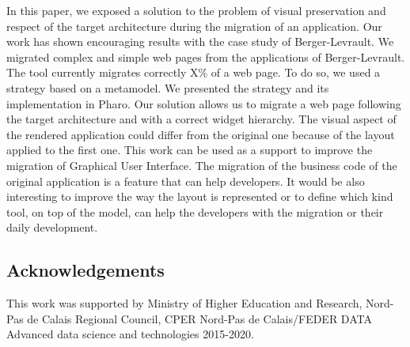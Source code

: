 \documentclass[conference]{IEEEtran}
\begin{document}
    
    In this paper, we exposed a solution to the problem of visual preservation
        and respect of the target architecture during the migration of an application.
    Our work has shown encouraging results with the case study of Berger-Levrault.
    We migrated complex and simple web pages from the applications of Berger-Levrault.
    The tool currently migrates correctly X\% of a web page. %
    To do so, we used a strategy based on a metamodel.
    We presented the strategy and its implementation in Pharo.
    Our solution allows us to migrate a web page following the target architecture and
        with a correct widget hierarchy.
    The visual aspect of the rendered application could differ from the original one because of
        the layout applied to the first one.
    This work can be used as a support to improve the migration of Graphical User Interface. 
    The migration of the business code of the original application is
        a feature that can help developers.
    It would be also interesting to improve the way the layout is represented or
        to define which kind tool, on top of the model, can help the developers 
        with the migration or their daily development.
     
    
    \subsection*{Acknowledgements} 
    This work was supported by Ministry of Higher Education and Research, Nord-Pas de Calais Regional Council, CPER Nord-Pas de Calais/FEDER DATA Advanced data science and technologies 2015-2020.
    
    
    
    
    
\end{document}

